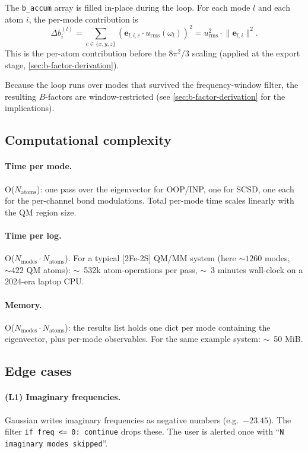 \documentclass[10pt,a4paper,twoside]{article}
\newcommand{\evec}{\mathbf{e}}
\newcommand{\urms}{u_{\mathrm{rms}}}
\begin{document}
The \texttt{b\_accum} array is filled in-place during the loop.
For each mode $l$ and each atom $i$, the per-mode contribution is
\[
  \Delta b_i^{(l)}
   = \sum_{c \in \{x,y,z\}} \left( \evec_{l,i,c} \cdot \urms(\omega_l) \right)^2
   = \urms^2 \cdot \lVert \evec_{l,i} \rVert^2.
\]
This is the per-atom contribution before the $8\pi^2/3$ scaling
(applied at the export stage,
\cref{sec:b-factor-derivation}).

Because the loop runs over modes that survived the
frequency-window filter, the resulting $B$-factors are
window-restricted (see \cref{sec:b-factor-derivation} for the
implications).

\subsection{Computational complexity}

\paragraph{Time per mode.} O($N_\text{atoms}$): one pass over the
eigenvector for OOP/INP, one for SCSD, one each for the
per-channel bond modulations. Total per-mode time scales linearly
with the QM region size.

\paragraph{Time per log.} O($N_\text{modes} \cdot N_\text{atoms}$).
For a typical [2Fe-2S] QM/MM system (here ${\sim}1260$ modes,
${\sim}422$ QM atoms): ${\sim}$~532k atom-operations per pass,
${\sim}$~3 minutes wall-clock on a 2024-era laptop CPU.

\paragraph{Memory.} O($N_\text{modes} \cdot N_\text{atoms}$): the
results list holds one dict per mode containing the eigenvector,
plus per-mode observables. For the same example system: ${\sim}$~50 MiB.

\subsection{Edge cases}

\paragraph{(L1) Imaginary frequencies.} Gaussian writes imaginary
frequencies as negative numbers (e.g.\ $-23.45$). The filter
\texttt{if freq <= 0: continue} drops these. The user is alerted
once with ``\texttt{N imaginary modes skipped}''.
\end{document}
